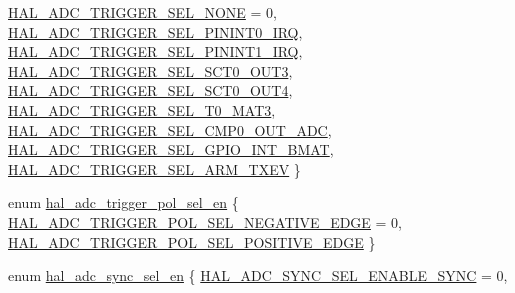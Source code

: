 \begin{DoxyCompactItemize}
\hyperlink{group__ADC_gga67fe859b54301579f1b1daef874514caaaf722f012bd0aa063b595333f9012a20}{H\+A\+L\+\_\+\+A\+D\+C\+\_\+\+T\+R\+I\+G\+G\+E\+R\+\_\+\+S\+E\+L\+\_\+\+N\+O\+NE} = 0, 
\hyperlink{group__ADC_gga67fe859b54301579f1b1daef874514caa2b6bc8f45ca02b89db9d0b827078a8ac}{H\+A\+L\+\_\+\+A\+D\+C\+\_\+\+T\+R\+I\+G\+G\+E\+R\+\_\+\+S\+E\+L\+\_\+\+P\+I\+N\+I\+N\+T0\+\_\+\+I\+RQ}, 
\hyperlink{group__ADC_gga67fe859b54301579f1b1daef874514caa81102caf42db5f4d5f7b958fe7d9ae6d}{H\+A\+L\+\_\+\+A\+D\+C\+\_\+\+T\+R\+I\+G\+G\+E\+R\+\_\+\+S\+E\+L\+\_\+\+P\+I\+N\+I\+N\+T1\+\_\+\+I\+RQ}, 
\hyperlink{group__ADC_gga67fe859b54301579f1b1daef874514caaca0d6e9551dede7c8a6d596930051e1b}{H\+A\+L\+\_\+\+A\+D\+C\+\_\+\+T\+R\+I\+G\+G\+E\+R\+\_\+\+S\+E\+L\+\_\+\+S\+C\+T0\+\_\+\+O\+U\+T3}, 
\newline
\hyperlink{group__ADC_gga67fe859b54301579f1b1daef874514caabd9e6d4d09caa99ca09a5f44e7797559}{H\+A\+L\+\_\+\+A\+D\+C\+\_\+\+T\+R\+I\+G\+G\+E\+R\+\_\+\+S\+E\+L\+\_\+\+S\+C\+T0\+\_\+\+O\+U\+T4}, 
\hyperlink{group__ADC_gga67fe859b54301579f1b1daef874514caaec235477986c69173f0ad5923a108e5c}{H\+A\+L\+\_\+\+A\+D\+C\+\_\+\+T\+R\+I\+G\+G\+E\+R\+\_\+\+S\+E\+L\+\_\+\+T0\+\_\+\+M\+A\+T3}, 
\hyperlink{group__ADC_gga67fe859b54301579f1b1daef874514caa2ad01d053980af503848525f78d777cf}{H\+A\+L\+\_\+\+A\+D\+C\+\_\+\+T\+R\+I\+G\+G\+E\+R\+\_\+\+S\+E\+L\+\_\+\+C\+M\+P0\+\_\+\+O\+U\+T\+\_\+\+A\+DC}, 
\hyperlink{group__ADC_gga67fe859b54301579f1b1daef874514caa6a9b003480c13c98d8cc1f80bf9c83d1}{H\+A\+L\+\_\+\+A\+D\+C\+\_\+\+T\+R\+I\+G\+G\+E\+R\+\_\+\+S\+E\+L\+\_\+\+G\+P\+I\+O\+\_\+\+I\+N\+T\+\_\+\+B\+M\+AT}, 
\newline
\hyperlink{group__ADC_gga67fe859b54301579f1b1daef874514caa246bfa95b40201277d6c5220c7b57d55}{H\+A\+L\+\_\+\+A\+D\+C\+\_\+\+T\+R\+I\+G\+G\+E\+R\+\_\+\+S\+E\+L\+\_\+\+A\+R\+M\+\_\+\+T\+X\+EV}
 \}
\item 
enum \hyperlink{group__ADC_ga4c5aa9e0991c432640845d2aedb971b2}{hal\+\_\+adc\+\_\+trigger\+\_\+pol\+\_\+sel\+\_\+en} \{ \hyperlink{group__ADC_gga4c5aa9e0991c432640845d2aedb971b2a007c22a34504d8557d98704becf95dc8}{H\+A\+L\+\_\+\+A\+D\+C\+\_\+\+T\+R\+I\+G\+G\+E\+R\+\_\+\+P\+O\+L\+\_\+\+S\+E\+L\+\_\+\+N\+E\+G\+A\+T\+I\+V\+E\+\_\+\+E\+D\+GE} = 0, 
\hyperlink{group__ADC_gga4c5aa9e0991c432640845d2aedb971b2a90868bfab7ec6bdbbca671834798002a}{H\+A\+L\+\_\+\+A\+D\+C\+\_\+\+T\+R\+I\+G\+G\+E\+R\+\_\+\+P\+O\+L\+\_\+\+S\+E\+L\+\_\+\+P\+O\+S\+I\+T\+I\+V\+E\+\_\+\+E\+D\+GE}
 \}
\item 
enum \hyperlink{group__ADC_ga8aa0efd767a9edc5a80b80c4061e0904}{hal\+\_\+adc\+\_\+sync\+\_\+sel\+\_\+en} \{ \hyperlink{group__ADC_gga8aa0efd767a9edc5a80b80c4061e0904a9b81d3ee891639da0e3cec4be09aa668}{H\+A\+L\+\_\+\+A\+D\+C\+\_\+\+S\+Y\+N\+C\+\_\+\+S\+E\+L\+\_\+\+E\+N\+A\+B\+L\+E\+\_\+\+S\+Y\+NC} = 0, 

\end{DoxyCompactItemize}
